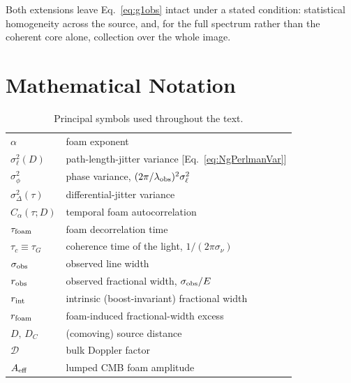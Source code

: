 \documentclass[aps,prd,onecolumn,amsmath,amssymb]{revtex4-2}
\begin{document}
Both extensions leave Eq.~\eqref{eq:g1obs} intact under a stated
condition: statistical homogeneity across the source, and, for the full
spectrum rather than the coherent core alone, collection over the whole
image.

\section*{Mathematical Notation}
\label{app:notation}

\begin{table}[!htb]
\caption{Principal symbols used throughout the text.}
\label{tab:notation}
\begin{ruledtabular}
\begin{tabular}{ll}
$\alpha$ & foam exponent \\
$\sigma_\ell^2(D)$ & path-length-jitter variance [Eq.~\eqref{eq:NgPerlmanVar}] \\
$\sigma_\phi^2$ & phase variance, $(2\pi/\lambda_{\rm obs})^2\sigma_\ell^2$ \\
$\sigma_\Delta^2(\tau)$ & differential-jitter variance \\
$C_\alpha(\tau;D)$ & temporal foam autocorrelation \\
$\tau_{\rm foam}$ & foam decorrelation time \\
$\tau_c\equiv\tau_G$ & coherence time of the light, $1/(2\pi\sigma_\nu)$ \\
$\sigma_{\rm obs}$ & observed line width \\
$r_{\rm obs}$ & observed fractional width, $\sigma_{\rm obs}/E$ \\
$r_{\rm int}$ & intrinsic (boost-invariant) fractional width \\
$r_{\rm foam}$ & foam-induced fractional-width excess \\
$D,\,D_C$ & (comoving) source distance \\
$\mathcal{D}$ & bulk Doppler factor \\
$A_{\rm eff}$ & lumped CMB foam amplitude \\
\end{tabular}
\end{ruledtabular}
\end{table}
\end{document}
